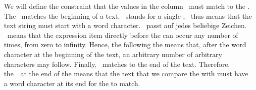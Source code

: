 We will define the constraint that the values in the column~ must match to the  .
The \textil{^}~matches the beginning of a text.
\textil{\\w}~stands for a single ,
\textil{^\\w}~thus means that the text string must start with a word character.
~passt auf jedes beliebige Zeichen.
\textil{*}~means that the expression item directly before the \textil{*} can occur any number of times, from zero to infinity.
Hence, the  following the \textil{^\\w} means that, after the word character at the beginning of the text, an arbitrary number of arbitrary characters may follow.
Finally, \textil{\$}~matches to the end of the text.
Therefore, the~\textil{\\w\$}~at the end of the  means that the text that we compare the  with must have a word character at its end for the  to match.

